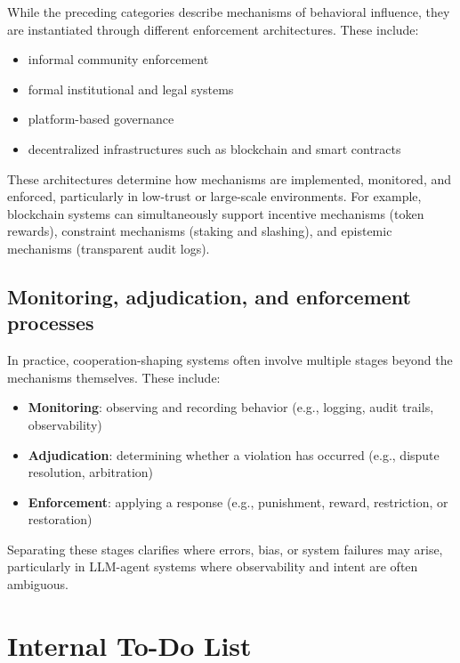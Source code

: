 {While the preceding categories describe mechanisms of behavioral influence, they are instantiated through different enforcement architectures. These include:

\begin{itemize}
    \item informal community enforcement
    \item formal institutional and legal systems
    \item platform-based governance
    \item decentralized infrastructures such as blockchain and smart contracts
\end{itemize}

These architectures determine how mechanisms are implemented, monitored, and enforced, particularly in low-trust or large-scale environments. For example, blockchain systems can simultaneously support incentive mechanisms (token rewards), constraint mechanisms (staking and slashing), and epistemic mechanisms (transparent audit logs).

\subsection{Monitoring, adjudication, and enforcement processes}

In practice, cooperation-shaping systems often involve multiple stages beyond the mechanisms themselves. These include:

\begin{itemize}
    \item \textbf{Monitoring}: observing and recording behavior (e.g., logging, audit trails, observability)
    \item \textbf{Adjudication}: determining whether a violation has occurred (e.g., dispute resolution, arbitration)
    \item \textbf{Enforcement}: applying a response (e.g., punishment, reward, restriction, or restoration)
\end{itemize}

Separating these stages clarifies where errors, bias, or system failures may arise, particularly in LLM-agent systems where observability and intent are often ambiguous.



}




\newpage
\section*{Internal To-Do List}


